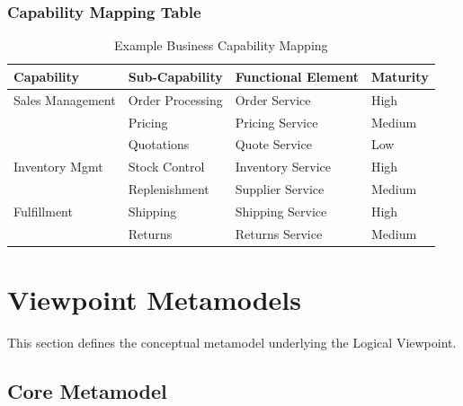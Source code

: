 \documentclass[11pt,letterpaper]{article}
\begin{document}
\subsubsection{Capability Mapping Table}

\begin{table}[H]
\centering
\caption{Example Business Capability Mapping}
\small
\begin{tabular}{@{}L{3cm}L{3cm}L{3cm}L{3.5cm}@{}}
\toprule
\textbf{Capability} & \textbf{Sub-Capability} & \textbf{Functional Element} & \textbf{Maturity} \\
\midrule
Sales Management & Order Processing & Order Service & High \\
 & Pricing & Pricing Service & Medium \\
 & Quotations & Quote Service & Low \\
\addlinespace
Inventory Mgmt & Stock Control & Inventory Service & High \\
 & Replenishment & Supplier Service & Medium \\
\addlinespace
Fulfillment & Shipping & Shipping Service & High \\
 & Returns & Returns Service & Medium \\
\bottomrule
\end{tabular}
\end{table}

\section{Viewpoint Metamodels}

This section defines the conceptual metamodel underlying the Logical Viewpoint.

\subsection{Core Metamodel}
\end{document}

